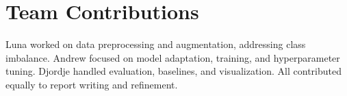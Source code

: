 \documentclass[11pt]{article}
\begin{document}



\section*{Team Contributions}

Luna worked on data preprocessing and augmentation, addressing class imbalance. Andrew focused on model adaptation, training, and hyperparameter tuning. Djordje handled evaluation, baselines, and visualization. All contributed equally to report writing and refinement.
%

% 



\end{document}
